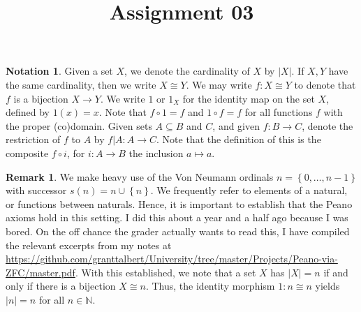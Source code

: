 \documentclass[11pt, letterpaper]{article}
\title{Assignment 03}
\theoremstyle{definition}
\newtheorem*{remark*}{Remark}
\newtheorem*{notation*}{Notation}
\begin{document}
\makeproblem

\begin{notation*}
	Given a set $X$, we denote the cardinality of $X$ by $\left| X \right| $. If $X,Y$ have the same cardinality, then we write $X \cong Y$. We may write $f : X \cong Y$ to denote that $f$ is a bijection $X\to Y$. We write $1$ or $1_X$ for the identity map on the set $X$, defined by $1(x) = x$. Note that $f\circ 1=f$ and $1\circ f=f$ for all functions $f$ with the proper (co)domain. Given sets $A\subseteq B$ and $C$, and given $f : B \to C$, denote the restriction of $f$ to $A$ by $f|A : A \to C$. Note that the definition of this is the composite $f\circ i$, for $i : A \to B$ the inclusion $a\mapsto a$.
\end{notation*}

\begin{remark*}
	We make heavy use of the Von Neumann ordinals $n = \left\{ 0, \ldots , n-1 \right\} $ with successor $s(n) = n \cup \left\{ n \right\} $. We frequently refer to elements of a natural, or functions between naturals. Hence, it is important to establish that the Peano axioms hold in this setting. I did this about a year and a half ago because I was bored. On the off chance the grader actually wants to read this, I have compiled the relevant excerpts from my notes at \url{https://github.com/granttalbert/University/tree/master/Projects/Peano-via-ZFC/master.pdf}. With this established, we note that a set $X$ has $\left| X \right| =n$ if and only if there is a bijection $X \cong n$. Thus, the identity morphism $1 : n \cong n$ yields $\left| n \right| =n$ for all $n\in\mathbb{N} $.
\end{remark*}
\end{document}
